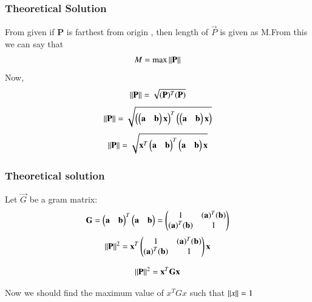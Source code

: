 \documentclass{beamer}
\begin{document}
\begin{frame}
\frametitle{Theoretical Solution}
From given if \textbf{P} is farthest from origin , then length of $\vec{P}$ is given as M.From this we can say  that
\begin{align}
   M=\text{max}\norm{\Vec{P}}
\end{align}
Now,
\begin{align}
    \norm{\Vec{P}}=\sqrt{(\Vec{P})^T(\Vec{P})}
\end{align}
\begin{align}
    \norm{\Vec{P}}=\sqrt{\brak{\myvec{\Vec{a}&\Vec{b}}\Vec{x}}^T\brak{\myvec{\Vec{a}&\Vec{b}}\Vec{x}}}
\end{align}
\begin{align}
    \norm{\Vec{P}}=\sqrt{\Vec{x}^T\myvec{\Vec{a}&\Vec{b}}^T\myvec{\Vec{a}&\Vec{b}}\Vec{x}}
\end{align}





\end{frame}
\begin{frame}
\frametitle{Theoretical solution}
Let $\Vec{G}$ be a gram matrix:
\begin{align}
    \Vec{G}=\myvec{\Vec{a}&\Vec{b}}^T\myvec{\Vec{a}&\Vec{b}}=\myvec{1&(\Vec{a})^T(\Vec{b})\\(\Vec{a})^T(\Vec{b})&1}
\end{align}
\begin{align}
       \norm{\Vec{P}}^2=\Vec{x}^T\myvec{1&(\Vec{a})^T(\Vec{b})\\(\Vec{a})^T(\Vec{b})&1}\Vec{x}
\end{align}

\begin{align}
\norm{\Vec{P}}^2=\Vec{x}^T\vec{G}\Vec{x}
  \end{align}

Now we should find the maximum value of \textbf{$x^TGx$} such that $\left\lVert x\right\rVert=1$\\


\end{frame}
\end{document}
